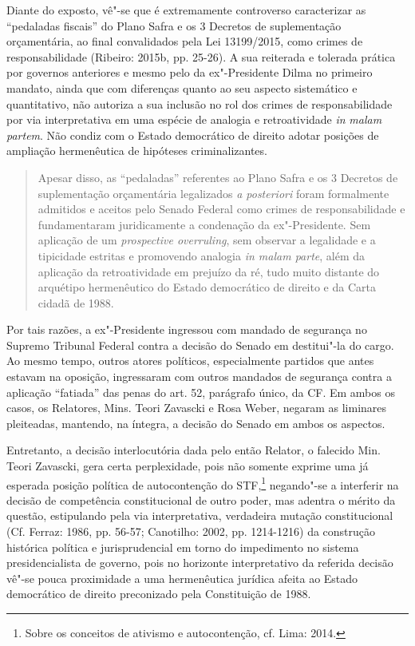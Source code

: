 Diante do exposto, vê"-se que é extremamente controverso caracterizar as
``pedaladas fiscais'' do Plano Safra e os 3 Decretos de suplementação
orçamentária, ao final convalidados pela Lei 13199/2015, como crimes de
responsabilidade (Ribeiro: 2015b, pp. 25-26). A sua reiterada e tolerada
prática por governos anteriores e mesmo pelo da ex"-Presidente Dilma no
primeiro mandato, ainda que com diferenças quanto ao seu aspecto
sistemático e quantitativo, não autoriza a sua inclusão no rol dos
crimes de responsabilidade por via interpretativa em uma espécie de
analogia e retroatividade \emph{in} \emph{malam partem}. Não condiz com
o Estado democrático de direito adotar posições de ampliação
hermenêutica de hipóteses criminalizantes.

\begin{quote}
Apesar disso, as ``pedaladas'' referentes ao Plano Safra e os 3 Decretos
de suplementação orçamentária legalizados \emph{a posteriori} foram
formalmente admitidos e aceitos pelo Senado Federal como crimes de
responsabilidade e fundamentaram juridicamente a condenação da
ex"-Presidente. Sem aplicação de um \emph{prospective overruling}, sem
observar a legalidade e a tipicidade estritas e promovendo analogia
\emph{in malam parte}, além da aplicação da retroatividade em prejuízo
da ré, tudo muito distante do arquétipo hermenêutico do Estado
democrático de direito e da Carta cidadã de 1988.
\end{quote}

Por tais razões, a ex"-Presidente ingressou com mandado de segurança no
Supremo Tribunal Federal contra a decisão do Senado em destitui"-la do
cargo. Ao mesmo tempo, outros atores políticos, especialmente partidos
que antes estavam na oposição, ingressaram com outros mandados de
segurança contra a aplicação ``fatiada'' das penas do art. 52, parágrafo
único, da CF. Em ambos os casos, os Relatores, Mins. Teori Zavascki e
Rosa Weber, negaram as liminares pleiteadas, mantendo, na íntegra, a
decisão do Senado em ambos os aspectos.

Entretanto, a decisão interlocutória dada pelo então Relator, o falecido
Min. Teori Zavascki, gera certa perplexidade, pois não somente exprime
uma já esperada posição política de autocontenção do STF,\footnote{Sobre
  os conceitos de ativismo e autocontenção, cf. Lima: 2014.} negando"-se
a interferir na decisão de competência constitucional de outro poder,
mas adentra o mérito da questão, estipulando pela via interpretativa,
verdadeira mutação constitucional (Cf. Ferraz: 1986, pp. 56-57;
Canotilho: 2002, pp. 1214-1216) da construção histórica política e
jurisprudencial em torno do impedimento no sistema presidencialista de
governo, pois no horizonte interpretativo da referida decisão vê"-se
pouca proximidade a uma hermenêutica jurídica afeita ao Estado
democrático de direito preconizado pela Constituição de 1988.

